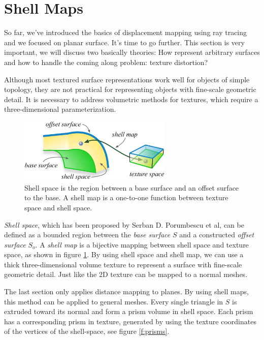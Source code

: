 \section{Shell Maps}
So far, we've introduced the basics of displacement mapping using ray tracing and we focused on planar surface. It's time to go further. This section is very important, we will discuss two basically theories: How represent arbitrary surfaces and how to handle the coming along problem: texture distortion?

Although most textured surface representations work well for objects of simple topology, they are not practical for representing objects with fine-scale geometric detail. It is necessary to address volumetric methods for textures, which require a three-dimensional parameterization. 

\begin{figure}\label{f:shell-space}
	\begin{center}
		\includegraphics[width=0.65\textwidth]{graphics/df/shell-maps-1}	
	\end{center}	
	\caption{Shell space is the region between a base surface and an offset surface to the base. A shell map is a one-to-one function between texture space and shell space.}
\end{figure}

\textit{Shell space}\cite{a:Shell-Maps}, which has been proposed by Serban D. Porumbescu et al, can be defined as a bounded region between the \textit{base surface} $S$ and a constructed \textit{offset surface} $S_{o}$. A \textit{shell map} is a bijective mapping between shell space and texture space, as shown in figure \ref{f:shell-space}. By using shell space and shell map, we can use a thick three-dimensional volume texture to represent a surface with fine-scale geometric detail. Just like the 2D texture can be mapped to a normal meshes.

The last section only applies distance mapping to planes. By using shell maps, this method can be applied to general meshes. Every single triangle in $S$ is extruded toward its normal and form a prism volume in shell space. Each prism has a corresponding prism in texture, generated by using the texture coordinates of the vertices of the shell-space, see figure \ref{f:prisms}.


